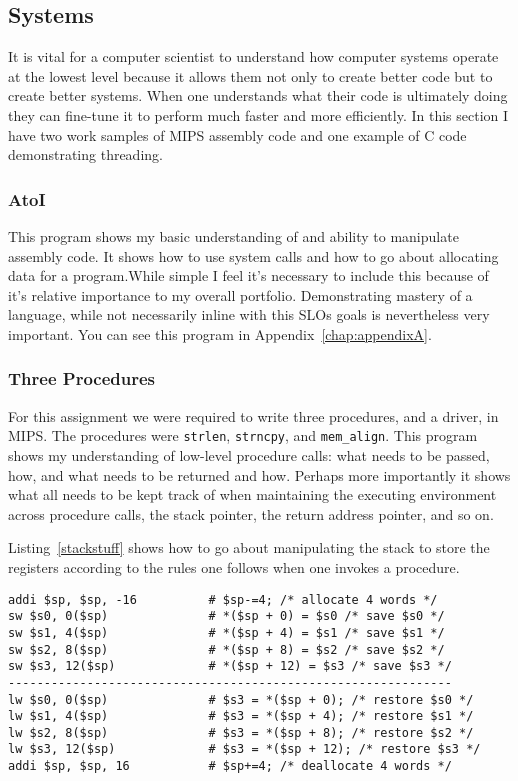 \subsection{Systems}
It is vital for a computer scientist to understand how computer systems operate at the lowest level because it allows them not only to create better code but to create better systems. When one understands what their code is ultimately doing they can fine-tune it to perform much faster and more efficiently. In this section I have two work samples of MIPS assembly code and one example of C code demonstrating threading.

\subsubsection{AtoI}
This program shows my basic understanding of and ability to manipulate assembly code. It shows how to use system calls and how to go about allocating data for a program.While simple I feel it's necessary to include this because of it's relative importance to my overall portfolio. Demonstrating mastery of a language, while not necessarily inline with this SLOs goals is nevertheless very important.
You can see this program in Appendix~\ref{chap:appendixA}.

\subsubsection{Three Procedures}
For this assignment we were required to write three procedures, and a driver, in MIPS. The procedures were \texttt{strlen}, \texttt{strncpy}, and \texttt{mem\_align}. This program shows my understanding of low-level procedure calls: what needs to be passed, how, and what needs to be returned and how. Perhaps more importantly it shows what all needs to be kept track of when maintaining the executing environment across procedure calls, the stack pointer, the return address pointer, and so on.

Listing~\ref{stackstuff} shows how to go about manipulating the stack to store the registers according to the rules one follows when one invokes a procedure.
\lstset{language=[mips]Assembler,basicstyle=\footnotesize,numbers=left,numberstyle=\footnotesize,label=stackstuff}
\begin{lstlisting}
addi $sp, $sp, -16          # $sp-=4; /* allocate 4 words */
sw $s0, 0($sp)              # *($sp + 0) = $s0 /* save $s0 */
sw $s1, 4($sp)              # *($sp + 4) = $s1 /* save $s1 */
sw $s2, 8($sp)              # *($sp + 8) = $s2 /* save $s2 */
sw $s3, 12($sp)             # *($sp + 12) = $s3 /* save $s3 */
--------------------------------------------------------------
lw $s0, 0($sp)              # $s3 = *($sp + 0); /* restore $s0 */
lw $s1, 4($sp)              # $s3 = *($sp + 4); /* restore $s1 */
lw $s2, 8($sp)              # $s3 = *($sp + 8); /* restore $s2 */
lw $s3, 12($sp)             # $s3 = *($sp + 12); /* restore $s3 */
addi $sp, $sp, 16           # $sp+=4; /* deallocate 4 words */
\end{lstlisting}

